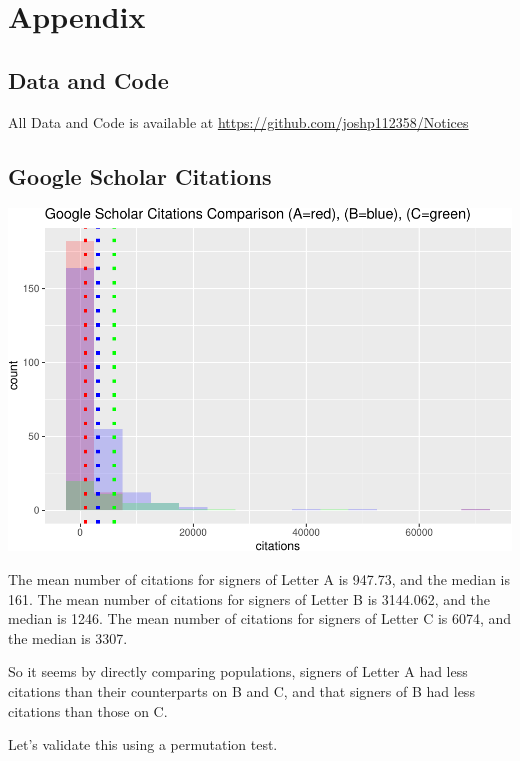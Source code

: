 \documentclass[]{article}
\begin{document}
\hypertarget{appendix}{%
\section{Appendix}\label{appendix}}

\hypertarget{data-and-code}{%
\subsection{Data and Code}\label{data-and-code}}

All Data and Code is available at
\url{https://github.com/joshp112358/Notices}

\hypertarget{google-scholar-citations}{%
\subsection{Google Scholar Citations}\label{google-scholar-citations}}

\includegraphics{final_files/figure-latex/unnamed-chunk-59-1.pdf}

The mean number of citations for signers of Letter A is 947.73, and the
median is 161. The mean number of citations for signers of Letter B is
3144.062, and the median is 1246. The mean number of citations for
signers of Letter C is 6074, and the median is 3307.

So it seems by directly comparing populations, signers of Letter A had
less citations than their counterparts on B and C, and that signers of B
had less citations than those on C.

Let's validate this using a permutation test.
\end{document}
